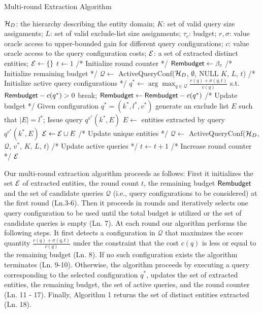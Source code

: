 \begin{algorithm}[h]
\small\caption{Multi-round Extraction Algorithm}
\label{algo:overall}
\begin{algorithmic}[1]
 $\mathcal{H}_D$: the hierarchy describing the entity domain; $K$: set of valid query size assignments; $L$: set of valid exclude-list size assignments; $\tau_c$: budget; $r,\sigma$: value oracle access to upper-bounded gain for different query configurations; $c$: value oracle access to the query configuration costs;
 $\mathcal{E}$: a set of extracted distinct entities;
\STATE $\mathcal{E} \leftarrow \{\}$
\STATE $t \leftarrow 1$ /* Initialize round counter */
\STATE ${\sf Rembudget} \leftarrow \beta_c$ /* Initialize remaining budget */
\STATE $\mathcal{Q} \leftarrow$ {\sf ActiveQueryConf($\mathcal{H}_D$, $\emptyset$, NULL $K$, $L$, $t$)} /* Initialize active query configurations */
	\STATE $q^* \leftarrow \arg\max_{q \in {\mathcal{Q}}} \frac{r(q)+\sigma(q,t)}{c(q)}$ s.t. ${\sf Rembudget} - c(q^*) >0$
		\STATE break;
	\ENDIF
	\STATE ${\sf Rembudget} \leftarrow {\sf Rembudget} - c(q^*)$ /* Update budget */
	\STATE Given configuration $q^* = (k^*,l^*,v^*)$ generate an exclude list $E$ such that $|E| = l^*$; 
	\STATE Issue query $q^{v^{*}}(k^*,E)$
	\STATE $E \leftarrow$ entities extracted by query $q^{v^{*}}(k^*,E)$
	\STATE $\mathcal{E} \leftarrow \mathcal{E} \cup E$ /* Update unique entities */
	\STATE $\mathcal{Q} \leftarrow$ {\sf ActiveQueryConf($\mathcal{H}_D$, $\mathcal{Q}$, $v^*$, $K$, $L$, $t$)} /* Update active queries */
	\STATE $t \leftarrow t + 1$ /* Increase round counter */
\ENDWHILE
\RETURN $\mathcal{E}$
\end{algorithmic}
\end{algorithm}

Our multi-round extraction algorithm proceeds as follows: First it initializes the set $\mathcal{E}$ of extracted entities, the round count $t$, the remaining budget ${\sf Rembudget}$ and the set of candidate queries $\mathcal{Q}$ (i.e., query configurations to be considered) at the first round (Ln.3-6). Then it proceeds in rounds and iteratively selects one query configuration to be used until the total budget is utilized or the set of candidate queries is empty (Ln. 7). At each round our algorithm performs the following steps. It first detects a configuration in $\mathcal{Q}$ that maximizes the score quantity $\frac{r(q) + \sigma(q,t)}{c(q)}$ under the constraint that the cost $c(q)$ is less or equal to the remaining budget (Ln. 8). If no such configuration exists the algorithm terminates (Ln. 9-10). Otherwise, the algorithm proceeds by executing a query corresponding to the selected configuration $q^*$, updates the set of extracted entities, the remaining budget, the set of active queries, and the round counter (Ln. 11 - 17). Finally, Algorithm 1 returns the set of distinct entities extracted (Ln. 18). 

